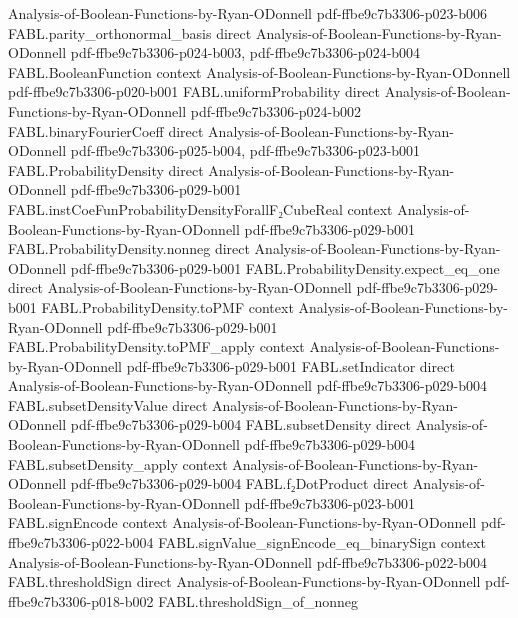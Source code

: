 \begin{theorem}
  {Analysis-of-Boolean-Functions-by-Ryan-ODonnell}
  {pdf-ffbe9c7b3306-p023-b006}
\proofstep
  {FABL.parity_orthonormal_basis}
  {direct}
  {Analysis-of-Boolean-Functions-by-Ryan-ODonnell}
  {pdf-ffbe9c7b3306-p024-b003,
    pdf-ffbe9c7b3306-p024-b004}
\proofstep
  {FABL.BooleanFunction}
  {context}
  {Analysis-of-Boolean-Functions-by-Ryan-ODonnell}
  {pdf-ffbe9c7b3306-p020-b001}
\proofstep
  {FABL.uniformProbability}
  {direct}
  {Analysis-of-Boolean-Functions-by-Ryan-ODonnell}
  {pdf-ffbe9c7b3306-p024-b002}
\proofstep
  {FABL.binaryFourierCoeff}
  {direct}
  {Analysis-of-Boolean-Functions-by-Ryan-ODonnell}
  {pdf-ffbe9c7b3306-p025-b004,
    pdf-ffbe9c7b3306-p023-b001}
\proofstep
  {FABL.ProbabilityDensity}
  {direct}
  {Analysis-of-Boolean-Functions-by-Ryan-ODonnell}
  {pdf-ffbe9c7b3306-p029-b001}
\proofstep
  {FABL.instCoeFunProbabilityDensityForallF₂CubeReal}
  {context}
  {Analysis-of-Boolean-Functions-by-Ryan-ODonnell}
  {pdf-ffbe9c7b3306-p029-b001}
\proofstep
  {FABL.ProbabilityDensity.nonneg}
  {direct}
  {Analysis-of-Boolean-Functions-by-Ryan-ODonnell}
  {pdf-ffbe9c7b3306-p029-b001}
\proofstep
  {FABL.ProbabilityDensity.expect_eq_one}
  {direct}
  {Analysis-of-Boolean-Functions-by-Ryan-ODonnell}
  {pdf-ffbe9c7b3306-p029-b001}
\proofstep
  {FABL.ProbabilityDensity.toPMF}
  {context}
  {Analysis-of-Boolean-Functions-by-Ryan-ODonnell}
  {pdf-ffbe9c7b3306-p029-b001}
\proofstep
  {FABL.ProbabilityDensity.toPMF_apply}
  {context}
  {Analysis-of-Boolean-Functions-by-Ryan-ODonnell}
  {pdf-ffbe9c7b3306-p029-b001}
\proofstep
  {FABL.setIndicator}
  {direct}
  {Analysis-of-Boolean-Functions-by-Ryan-ODonnell}
  {pdf-ffbe9c7b3306-p029-b004}
\proofstep
  {FABL.subsetDensityValue}
  {direct}
  {Analysis-of-Boolean-Functions-by-Ryan-ODonnell}
  {pdf-ffbe9c7b3306-p029-b004}
\proofstep
  {FABL.subsetDensity}
  {direct}
  {Analysis-of-Boolean-Functions-by-Ryan-ODonnell}
  {pdf-ffbe9c7b3306-p029-b004}
\proofstep
  {FABL.subsetDensity_apply}
  {context}
  {Analysis-of-Boolean-Functions-by-Ryan-ODonnell}
  {pdf-ffbe9c7b3306-p029-b004}
\proofstep
  {FABL.f₂DotProduct}
  {direct}
  {Analysis-of-Boolean-Functions-by-Ryan-ODonnell}
  {pdf-ffbe9c7b3306-p023-b001}
\proofstep
  {FABL.signEncode}
  {context}
  {Analysis-of-Boolean-Functions-by-Ryan-ODonnell}
  {pdf-ffbe9c7b3306-p022-b004}
\proofstep
  {FABL.signValue_signEncode_eq_binarySign}
  {context}
  {Analysis-of-Boolean-Functions-by-Ryan-ODonnell}
  {pdf-ffbe9c7b3306-p022-b004}
\proofstep
  {FABL.thresholdSign}
  {direct}
  {Analysis-of-Boolean-Functions-by-Ryan-ODonnell}
  {pdf-ffbe9c7b3306-p018-b002}
\proofstep
  {FABL.thresholdSign_of_nonneg}

\end{theorem}
